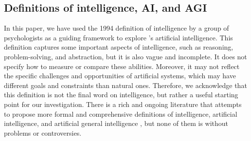 \subsection{Definitions of intelligence, AI, and AGI} \label{sec:otherdefinitions}
In this paper, we have used the 1994 definition of intelligence by a group of psychologists \cite{gottfredson1997mainstream} as a guiding framework to explore \DV's artificial intelligence. This definition captures some important aspects of intelligence, such as reasoning, problem-solving, and abstraction, but it is also vague and incomplete. It does not specify how to measure or compare these abilities. Moreover, it may not reflect the specific challenges and opportunities of artificial systems, which may have different goals and constraints than natural ones. Therefore, we acknowledge that this definition is not the final word on intelligence, but rather a useful starting point for our investigation. There is a rich and ongoing literature that attempts to propose more formal and comprehensive definitions of intelligence, artificial intelligence, and artificial general intelligence \cite{goertzel2014artificial, chollet2019measure}, but none of them is without problems or controversies.
